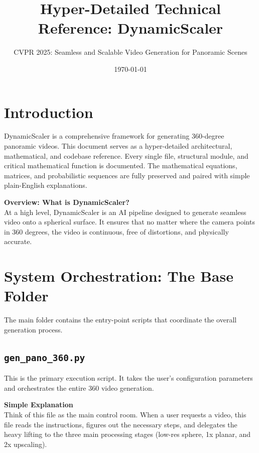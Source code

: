 \documentclass[11pt,a4paper]{article}
\title{Hyper-Detailed Technical Reference: DynamicScaler}
\author{CVPR 2025: Seamless and Scalable Video Generation for Panoramic Scenes}
\date{\today}
\begin{document}
\maketitle
\tableofcontents
\newpage

\section{Introduction}
DynamicScaler is a comprehensive framework for generating 360-degree panoramic videos. This document serves as a hyper-detailed architectural, mathematical, and codebase reference. Every single file, structural module, and critical mathematical function is documented. The mathematical equations, matrices, and probabilistic sequences are fully preserved and paired with simple plain-English explanations.

\begin{simplebox}
\textbf{Overview: What is DynamicScaler?} \\
At a high level, DynamicScaler is an AI pipeline designed to generate seamless video onto a spherical surface. It ensures that no matter where the camera points in 360 degrees, the video is continuous, free of distortions, and physically accurate.
\end{simplebox}

\section{System Orchestration: The Base Folder}

The main folder contains the entry-point scripts that coordinate the overall generation process.

\subsection{\texttt{gen\_pano\_360.py}}
This is the primary execution script. It takes the user's configuration parameters and orchestrates the entire 360 video generation. 

\begin{simplebox}
\textbf{Simple Explanation} \\
Think of this file as the main control room. When a user requests a video, this file reads the instructions, figures out the necessary steps, and delegates the heavy lifting to the three main processing stages (low-res sphere, 1x planar, and 2x upscaling).
\end{simplebox}
\end{document}
